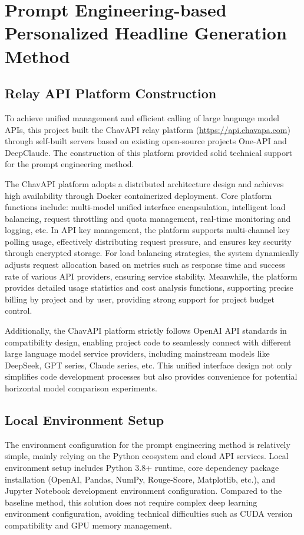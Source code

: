 \documentclass[10pt,a4paper]{article}
\begin{document}
\section{Prompt Engineering-based Personalized Headline Generation Method}
\subsection{Relay API Platform Construction}
To achieve unified management and efficient calling of large language model APIs, this project built the ChavAPI relay platform (\url{https://api.chavapa.com}) through self-built servers based on existing open-source projects One-API and DeepClaude. The construction of this platform provided solid technical support for the prompt engineering method.

The ChavAPI platform adopts a distributed architecture design and achieves high availability through Docker containerized deployment. Core platform functions include: multi-model unified interface encapsulation, intelligent load balancing, request throttling and quota management, real-time monitoring and logging, etc. In API key management, the platform supports multi-channel key polling usage, effectively distributing request pressure, and ensures key security through encrypted storage. For load balancing strategies, the system dynamically adjusts request allocation based on metrics such as response time and success rate of various API providers, ensuring service stability. Meanwhile, the platform provides detailed usage statistics and cost analysis functions, supporting precise billing by project and by user, providing strong support for project budget control.

Additionally, the ChavAPI platform strictly follows OpenAI API standards in compatibility design, enabling project code to seamlessly connect with different large language model service providers, including mainstream models like DeepSeek, GPT series, Claude series, etc. This unified interface design not only simplifies code development processes but also provides convenience for potential horizontal model comparison experiments.

\subsection{Local Environment Setup}
The environment configuration for the prompt engineering method is relatively simple, mainly relying on the Python ecosystem and cloud API services. Local environment setup includes Python 3.8+ runtime, core dependency package installation (OpenAI, Pandas, NumPy, Rouge-Score, Matplotlib, etc.), and Jupyter Notebook development environment configuration. Compared to the baseline method, this solution does not require complex deep learning environment configuration, avoiding technical difficulties such as CUDA version compatibility and GPU memory management.
\end{document}
